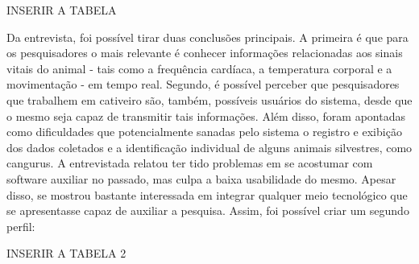 INSERIR A TABELA

Da entrevista, foi possível tirar duas conclusões principais. A primeira é que para os pesquisadores o mais relevante é conhecer informações relacionadas aos sinais vitais do animal - tais como a frequência cardíaca, a temperatura corporal e a movimentação - em tempo real. Segundo, é possível perceber que pesquisadores que trabalhem em cativeiro são, também, possíveis usuários do sistema, desde que o mesmo seja capaz de transmitir tais informações.
Além disso, foram apontadas como dificuldades que potencialmente sanadas pelo sistema o registro e exibição dos dados coletados e a identificação individual de alguns animais silvestres, como cangurus.
A entrevistada relatou ter tido problemas em se acostumar com software auxiliar no passado, mas culpa a baixa usabilidade do mesmo. Apesar disso, se mostrou bastante interessada em integrar qualquer meio tecnológico que se apresentasse capaz de auxiliar a pesquisa.
Assim, foi possível criar um segundo perfil:

INSERIR A TABELA 2

